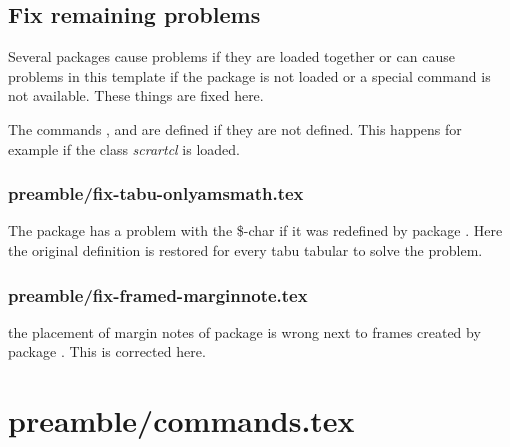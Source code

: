 \subsection{Fix remaining problems}
\label{sec:style:fix}

Several packages cause problems if they are loaded together or can cause problems in this template if the package is not loaded or a special command is not available. These things are fixed here.

The commands ,  and  are defined if they are not defined. This happens for example if the class \emph{scrartcl} is loaded.


\subsubsection{preamble/fix-tabu-onlyamsmath.tex}

The package  has a problem with the \$-char if it was redefined by package . Here the original definition is restored for every tabu tabular to solve the problem.


\subsubsection{preamble/fix-framed-marginnote.tex}

the placement of margin notes of package  is wrong next to frames created by package . This is corrected here.



\section{preamble/commands.tex}

